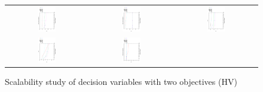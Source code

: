 
\begin{figure}[h]
\centering
\caption{Scalability study of decision variables with two objectives (HV)}
\label{fig:Scalability_Study_HV_1}
\begin{tabular}{ccc}
   \includegraphics[width=0.23\textwidth, angle=-90,origin=c]{Images/DTLZ4_2obj_Scalability.eps} &
    \includegraphics[width=0.23\textwidth, angle=-90,origin=c]{Images/DTLZ7_2obj_Scalability.eps} &
    \includegraphics[width=0.23\textwidth,  angle=-90,origin=c]{Images/UF7_Scalability.eps}  
    \\
   \includegraphics[width=0.23\textwidth, angle=-90,origin=c]{Images/UF5_Scalability.eps} &
   \includegraphics[width=0.23\textwidth, angle=-90,origin=c]{Images/WFG2_2obj_Scalability.eps} &

\end{tabular}
\end{figure}
